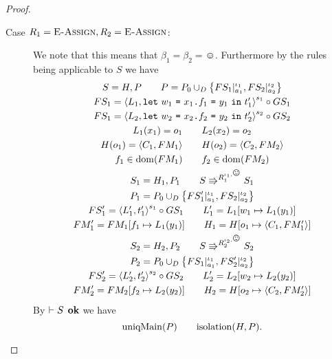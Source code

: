 \begin{proof}
  \begin{description}
    \item[Case $R_1 = \mbox{{\sc E-Assign}}, R_2 = \mbox{{\sc E-Assign}}$:] We note that this means that
      $\beta_1 = \beta_2 = \smiley$. Furthermore by the rules being applicable
      to $S$ we have
      \begin{equation}
        \begin{gathered}
          S = H, P \andalso P = P_0 \cup_D \left\{ FS_1|_{a_1}^{\iota_1},
          FS_2|_{a_2}^{\iota_2} \right\} \\
          FS_1 = \xframe{L_1, \Let{w_1}{\FAss{x_1}{f_1}{y_1}}{t'_1}}^{s_1} \circ GS_1
          \\ 
          FS_1 = \xframe{L_2, \Let{w_2}{\FAss{x_2}{f_2}{y_2}}{t'_2}}^{s_2}
          \circ GS_2 \\
          L_1(x_1) = o_1 \andalso L_2(x_2) = o_2 \\
          H(o_1) = \Obj{C_1, FM_1} \andalso H(o_2) = \Obj{C_2, FM_2} \\
          f_1 \in \dom(FM_1) \andalso f_2 \in \dom(FM_2) \\
          S_1 = H_1, P_1 \andalso S \Rrightarrow^{R_1^{\iota_1, \smiley}} S_1
          \\
          P_1 = P_0 \cup_D \left\{ FS'_1|_{a_1}^{\iota_1},
          FS_2|_{a_2}^{\iota_2} \right\} \\
          FS'_1 = \xframe{L'_1, t'_1}^{s_1} \circ GS_1  \andalso L'_1 = L_1[w_1 \mapsto
          L_1(y_1)] \\
          FM'_1 = FM_1[f_1 \mapsto L_1(y_1)] \andalso H_1 = H[o_1 \mapsto
          \Obj{C_1, FM'_1}]
          \\
          S_2 = H_2, P_2 \andalso S \Rrightarrow^{R_2^{\iota_2, \smiley}} S_2
          \\
          P_2 = P_0 \cup_D \left\{ FS_1|_{a_1}^{\iota_1},
          FS'_2|_{a_2}^{\iota_2} \right\} \\
          FS'_2 = \xframe{L'_2, t'_2}^{s_2} \circ GS_2  \andalso L'_2 = L_2[w_2 \mapsto
          L_2(y_2)] \\
          FM'_2 = FM_2[f_2 \mapsto L_2(y_2)] \andalso H_2 = H[o_2 \mapsto
          \Obj{C_2, FM'_2}]
          \\
        \end{gathered}
      \end{equation}
      By $\vdash S \:\: \mbox{\bf ok}$ we have
      \begin{equation}
        \mbox{$\mathrm{uniqMain}$}(P) \quad\quad \mbox{$\mathrm{isolation}$}(H, P).
      \end{equation}

\end{description}
\end{proof}
